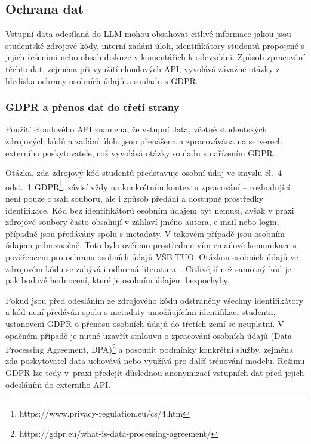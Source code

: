 \subsection{Ochrana dat}
\label{subsec:llm-data-security}

Vstupní data odesílaná do LLM mohou obsahovat citlivé informace jakou jsou studentské zdrojové kódy, interní zadání úloh, identifikátory studentů propojené s jejich řešeními nebo obsah diskuze v komentářích k odevzdání.
Způsob zpracování těchto dat, zejména při využití cloudových API, vyvolává závažné otázky z hlediska ochrany osobních údajů a souladu s GDPR\@.

\subsubsection*{GDPR a přenos dat do třetí strany}
\label{subsubsec:gdpr-data-transfer}

Použití cloudového API znamená, že vstupní data, včetně studentských zdrojových kódů a zadání úloh, jsou přenášena a zpracovávána na serverech externího poskytovatele, což vyvolává otázky souladu s nařízením GDPR\@.

Otázka, zda zdrojový kód studentů představuje osobní údaj ve smyslu čl.~4 odst.~1 GDPR\footnote{https://www.privacy-regulation.eu/cs/4.htm}, závisí vždy na konkrétním kontextu zpracování -- rozhodující není pouze obsah souboru, ale i způsob předání a dostupné prostředky identifikace.
Kód bez identifikátorů osobním údajem být nemusí, avšak v praxi zdrojové soubory často obsahují v záhlaví jméno autora, e-mail nebo login, případně jsou předávány spolu s metadaty.
V takovém případě jsou osobním údajem jednoznačně.
Toto bylo ověřeno prostřednictvím emailové komunikace s pověřencem pro ochranu osobních údajů VŠB-TUO\@.
Otázkou osobních údajů ve zdrojovém kódu se zabývá i odborná literatura~\cite{kocetkov-stack}.
Citlivější než samotný kód je pak bodové hodnocení, které je osobním údajem bezpochyby.

Pokud jsou před odesláním ze zdrojového kódu odstraněny všechny identifikátory a kód není předáván spolu s metadaty umožňujícími identifikaci studenta, ustanovení GDPR o přenosu osobních údajů do třetích zemí se neuplatní.
V opačném případě je nutné uzavřít smlouvu o zpracování osobních údajů (Data Processing Agreement, DPA)\footnote{https://gdpr.eu/what-is-data-processing-agreement/} a posoudit podmínky konkrétní služby, zejména zda poskytovatel data uchovává nebo využívá pro další trénování modelu.
Režimu GDPR lze tedy v~praxi předejít důslednou anonymizací vstupních dat před jejich odesláním do externího API\@.

\endinput
